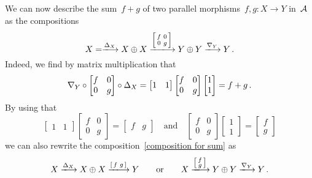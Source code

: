 \begin{remark}
  We can now describe the sum~$f + g$ of two parallel morphisms~$f, g \colon X \to Y$ in~$\mathcal{A}$ as the compositions
  \begin{equation}
    \label{composition for sum}
      X=
    \xlongto{\diag_X}
      X \oplus X
    \xlongto{\begin{bsmallmatrix} f & 0 \\ 0 & g \end{bsmallmatrix}}
      Y \oplus Y
    \xlongto{\codiag_Y}
      Y \,.
  \end{equation}
  Indeed, we find by matrix multiplication that
  \[
      \nabla_Y
      \circ
      \begin{bmatrix}
        f & 0 \\
        0 & g
      \end{bmatrix}
      \circ
      \Delta_X
    = \begin{bmatrix}
        1 & 1
      \end{bmatrix}
      \begin{bmatrix}
        f & 0 \\
        0 & g
      \end{bmatrix}
      \begin{bmatrix}
        1 \\
        1
      \end{bmatrix}
    = f + g \,.
  \]
  By using that
  \[
    \begin{bmatrix}
      1 & 1
    \end{bmatrix}
    \begin{bmatrix}
      f & 0 \\
      0 & g
    \end{bmatrix}
    =
    \begin{bmatrix}
      f & g
    \end{bmatrix}
    \quad\text{and}\quad
    \begin{bmatrix}
      f & 0 \\
      0 & g
    \end{bmatrix}
    \begin{bmatrix}
      1 \\
      1
    \end{bmatrix}
    =
    \begin{bmatrix}
      f \\
      g
    \end{bmatrix}
  \]
  we can also rewrite the composition~\eqref{composition for sum} as
  \[
      X
    \xlongto{\diag_X}
      X \oplus X
    \xlongto{\begin{bsmallmatrix} f & g \end{bsmallmatrix}}
      Y
    \qquad\text{or}\qquad
      X
    \xlongto{\begin{bsmallmatrix} f \\ g \end{bsmallmatrix}}
      Y \oplus Y
    \xlongto{\codiag_Y}
      Y \,.
  \]
  

\end{remark}
